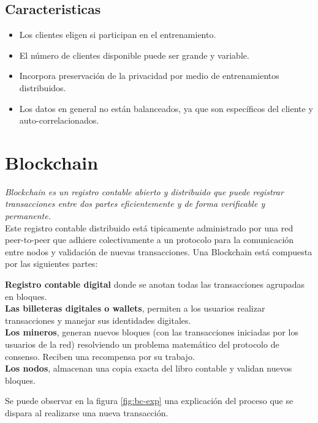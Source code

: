 \documentclass[
11pt, %
oneside, %
spanish, %
singlespacing, %
parskip, %
headsepline, %
chapterinoneline, %
]{MastersDoctoralThesis} %
\begin{document}
\subsection*{Caracteristicas}
\begin{itemize}
\item Los clientes eligen si participan en el entrenamiento. 
\item El número de clientes disponible puede ser grande y variable.
\item Incorpora preservación de la privacidad por medio de entrenamientos distribuidos.
\item Los datos en general no están balanceados, ya que son específicos del cliente y auto-correlacionados.
\end{itemize}


\section{Blockchain \cite{bc}}

\textit{Blockchain es un registro contable abierto y distribuido que puede registrar transacciones entre dos partes eficientemente y de forma verificable y permanente.}\cite{bc-def} \\

Este registro contable distribuido está tipicamente administrado por una red peer-to-peer que adhiere colectivamente a un protocolo para la comunicación entre nodos y validación de nuevas transacciones.
Una Blockchain está compuesta por las siguientes partes:

\textbf{Registro contable digital} donde se anotan todas las transacciones agrupadas en bloques. \\
\textbf{Las billeteras digitales o wallets}, permiten a los usuarios realizar transacciones y manejar sus identidades digitales. \\
\textbf{Los mineros}, generan nuevos bloques (con las transacciones iniciadas por los usuarios de la red) resolviendo un problema matemático del protocolo de consenso. Reciben una recompensa por su trabajo. \\
\textbf{Los nodos}, almacenan una copia exacta del libro contable y validan nuevos bloques.

Se puede observar en la figura \ref{fig:bc-exp} una explicación del proceso que se dispara al realizarse una nueva transacción. 
\end{document}
